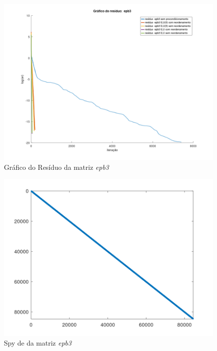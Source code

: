 \begin{figure}[H]
    \centering
         \centering
         \includegraphics[width=.6\linewidth]{images/epb3.png}
         \caption{Gráfico do Resíduo da matriz \textit{epb3}}
         \label{fig:epb-res}
\end{figure}

\begin{figure}[H]
    \centering
         \centering
         \includegraphics[width=.5\linewidth]{images/epb3_spyA.png}
         \caption{Spy de da matriz \textit{epb3}}
         \label{fig:epb-spy-a}
\end{figure}


